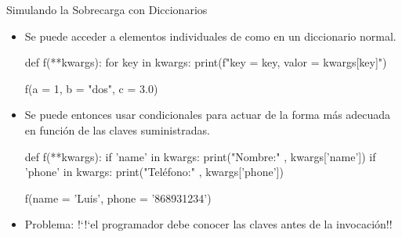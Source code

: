 \documentclass[10pt,envcountsect,spanish]{beamer}
\begin{document}
\begin{frame}[fragile]{Simulando la Sobrecarga con Diccionarios}
\small
\begin{itemize}\setlength{\itemsep}{0mm}
\item Se puede acceder a elementos individuales de  como en un diccionario normal.

{\footnotesize
\begin{pyconsole}[][frame=single]
def f(**kwargs):
    for key in kwargs:
        print(f"key = {key}, valor = {kwargs[key]}") 
        
f(a = 1, b = "dos", c = 3.0)
\end{pyconsole}    
}

\item Se puede entonces usar condicionales para actuar de la forma más adecuada en función de las claves suministradas.

{\footnotesize
\begin{pyconsole}[][frame=single]
def f(**kwargs):
    if 'name' in kwargs:
        print("Nombre:" , kwargs['name'])
    if 'phone' in kwargs:
        print("Teléfono:" , kwargs['phone'])
        
f(name = 'Luis', phone =  '868931234')
\end{pyconsole}    
}

\item Problema: !`!`el programador debe conocer  las claves antes de la invocación!!
\end{itemize}

\end{frame}
\end{document}
